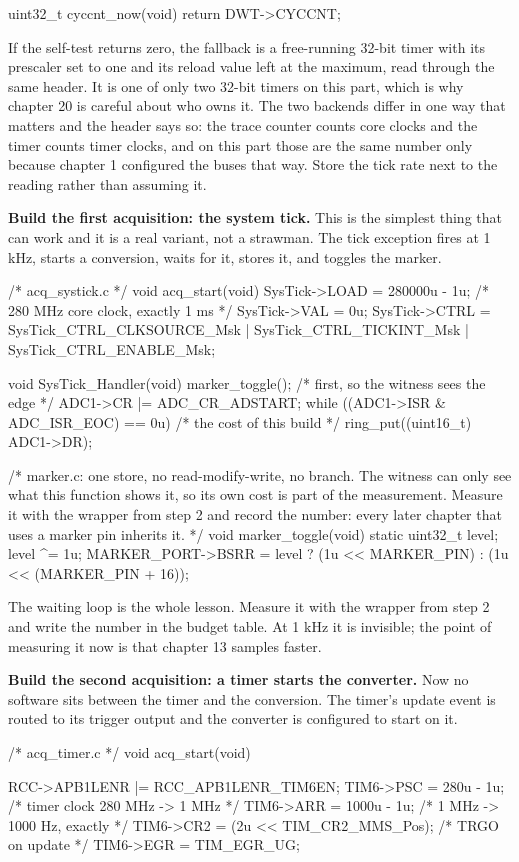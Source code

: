 \begin{steps}
\begin{ccode}
uint32_t cyccnt_now(void) { return DWT->CYCCNT; }
\end{ccode}
If the self-test returns zero, the fallback is a free-running 32-bit timer with
its prescaler set to one and its reload value left at the maximum, read through
the same header. It is one of only two 32-bit timers on this part, which is why
chapter 20 is careful about who owns it. The two backends differ in one way
that matters and the header says so: the trace counter counts core clocks and
the timer counts timer clocks, and on this part those are the same number only
because chapter 1 configured the buses that way. Store the tick rate next to
the reading rather than assuming it.

\item \textbf{Build the first acquisition: the system tick.} This is the
simplest thing that can work and it is a real variant, not a strawman. The tick
exception fires at 1 kHz, starts a conversion, waits for it, stores it, and
toggles the marker.
\begin{ccode}
/* acq_systick.c */
void acq_start(void)
{
    SysTick->LOAD = 280000u - 1u;     /* 280 MHz core clock, exactly 1 ms */
    SysTick->VAL  = 0u;
    SysTick->CTRL = SysTick_CTRL_CLKSOURCE_Msk | SysTick_CTRL_TICKINT_Msk
                  | SysTick_CTRL_ENABLE_Msk;
}

void SysTick_Handler(void)
{
    marker_toggle();                  /* first, so the witness sees the edge */
    ADC1->CR |= ADC_CR_ADSTART;
    while ((ADC1->ISR & ADC_ISR_EOC) == 0u) { }   /* the cost of this build */
    ring_put((uint16_t) ADC1->DR);
}

/* marker.c: one store, no read-modify-write, no branch. The witness can only
   see what this function shows it, so its own cost is part of the measurement.
   Measure it with the wrapper from step 2 and record the number: every later
   chapter that uses a marker pin inherits it. */
void marker_toggle(void)
{
    static uint32_t level;
    level ^= 1u;
    MARKER_PORT->BSRR = level ? (1u << MARKER_PIN)
                              : (1u << (MARKER_PIN + 16));
}
\end{ccode}
The waiting loop is the whole lesson. Measure it with the wrapper from step 2
and write the number in the budget table. At 1 kHz it is invisible; the point of
measuring it now is that chapter 13 samples faster.

\item \textbf{Build the second acquisition: a timer starts the converter.} Now
no software sits between the timer and the conversion. The timer's update event
is routed to its trigger output and the converter is configured to start on it.
\begin{ccode}
/* acq_timer.c */
void acq_start(void)
{
    RCC->APB1LENR |= RCC_APB1LENR_TIM6EN;
    TIM6->PSC = 280u - 1u;            /* timer clock 280 MHz -> 1 MHz */
    TIM6->ARR = 1000u - 1u;           /* 1 MHz -> 1000 Hz, exactly */
    TIM6->CR2 = (2u << TIM_CR2_MMS_Pos);          /* TRGO on update */
    TIM6->EGR = TIM_EGR_UG;

}
\end{ccode}
\end{steps}
